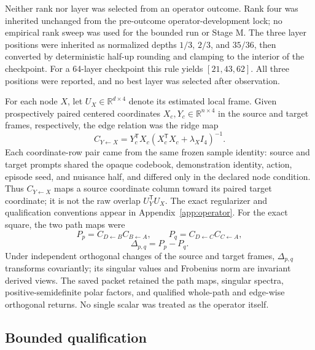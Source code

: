 \documentclass[10pt,a4paper]{article}
\begin{document}
Neither rank nor layer was selected from an operator outcome. Rank four was inherited unchanged from the pre-outcome operator-development lock; no empirical rank sweep was used for the bounded run or Stage M. The three layer positions were inherited as normalized depths $1/3$, $2/3$, and $35/36$, then converted by deterministic half-up rounding and clamping to the interior of the checkpoint. For a 64-layer checkpoint this rule yields $[21,43,62]$. All three positions were reported, and no best layer was selected after observation.

For each node $X$, let $U_X\in\mathbb R^{d\times4}$ denote its estimated local frame. Given prospectively paired centered coordinates $X_c,Y_c\in\mathbb R^{n\times4}$ in the source and target frames, respectively, the edge relation was the ridge map
\begin{equation}
 C_{Y\leftarrow X}=Y_c^{\mathsf T}X_c
 \left(X_c^{\mathsf T}X_c+\lambda_X I_4\right)^{-1}.
 \label{eq:ridge-edge}
\end{equation}
Each coordinate-row pair came from the same frozen sample identity: source and target prompts shared the opaque codebook, demonstration identity, action, episode seed, and nuisance half, and differed only in the declared node condition. Thus $C_{Y\leftarrow X}$ maps a source coordinate column toward its paired target coordinate; it is not the raw overlap $U_Y^{\mathsf T}U_X$. The exact regularizer and qualification conventions appear in Appendix~\ref{app:operator}. For the exact square, the two path maps were
\begin{equation}
 P_p=C_{D\leftarrow B}C_{B\leftarrow A},\qquad
 P_q=C_{D\leftarrow C}C_{C\leftarrow A},
 \label{eq:pathmaps}
\end{equation}
\begin{equation}
 \Delta_{p,q}=P_p-P_q.
 \label{eq:delta}
\end{equation}
Under independent orthogonal changes of the source and target frames, $\Delta_{p,q}$ transforms covariantly; its singular values and Frobenius norm are invariant derived views. The saved packet retained the path maps, singular spectra, positive-semidefinite polar factors, and qualified whole-path and edge-wise orthogonal returns. No single scalar was treated as the operator itself.

\subsection{Bounded qualification}
\end{document}
